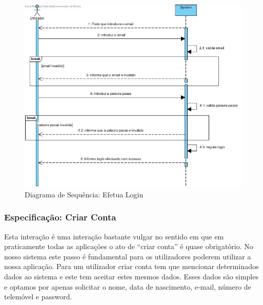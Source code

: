 \begin{figure}[htb!]
	\centering
	\includegraphics[scale=0.5]{imagens/diagramaSeq/Login}  
	\caption{Diagrama de Sequência: Efetua Login }  
\end{figure}



\newpage

\subsubsection{Especificação: Criar Conta }
Esta interação é uma interação bastante vulgar no sentido em que em praticamente todas as aplicações o ato de “criar conta” é quase obrigatório.  No nosso sistema este passo é fundamental para os utilizadores poderem utilizar a nossa aplicação. Para um utilizador criar conta tem que mencionar determinados dados ao sistema e este tem aceitar estes mesmos dados. Esses dados são simples e optamos por apenas solicitar o nome, data de nascimento, e-mail, número de telemóvel e password.

